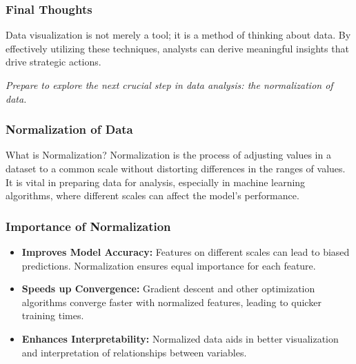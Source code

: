 \documentclass[aspectratio=169]{beamer}
\begin{document}
\begin{frame}[fragile]
  \frametitle{Final Thoughts}
  Data visualization is not merely a tool; it is a method of thinking about data. 
  By effectively utilizing these techniques, analysts can derive meaningful insights that drive strategic actions.

  \textit{Prepare to explore the next crucial step in data analysis: the normalization of data.}
\end{frame}

\begin{frame}[fragile]
    \frametitle{Normalization of Data}
    \begin{block}{What is Normalization?}
        Normalization is the process of adjusting values in a dataset to a common scale without distorting differences in the ranges of values. It is vital in preparing data for analysis, especially in machine learning algorithms, where different scales can affect the model's performance.
    \end{block}
\end{frame}

\begin{frame}[fragile]
    \frametitle{Importance of Normalization}
    \begin{itemize}
        \item \textbf{Improves Model Accuracy:} Features on different scales can lead to biased predictions. Normalization ensures equal importance for each feature.
        \item \textbf{Speeds up Convergence:} Gradient descent and other optimization algorithms converge faster with normalized features, leading to quicker training times.
        \item \textbf{Enhances Interpretability:} Normalized data aids in better visualization and interpretation of relationships between variables.
    \end{itemize}
\end{frame}
\end{document}
